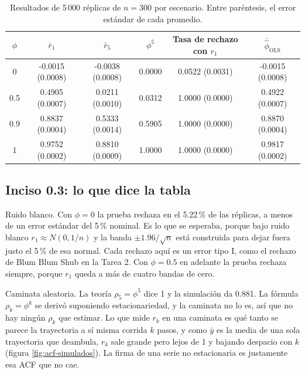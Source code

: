 \documentclass[11pt]{article}
\begin{document}
\begin{table}[H]
\centering
\caption{Resultados de 5\,000 réplicas de $n=300$ por escenario. Entre paréntesis, el error
estándar de cada promedio.}\label{tab:ar1}
\small
\begin{tabular}{|c|c|c|c|c|c|}
\hline
$\phi$ & $\bar r_1$ & $\bar r_5$ & $\phi^5$ & Tasa de rechazo con $r_1$ & $\bar{\hat\phi}_{\text{OLS}}$ \\
\hline
0 & -0.0015 (0.0008) & -0.0038 (0.0008) & 0.0000 & 0.0522 (0.0031) & -0.0015 (0.0008) \\
0.5 & 0.4905 (0.0007) & 0.0211 (0.0010) & 0.0312 & 1.0000 (0.0000) & 0.4922 (0.0007) \\
0.9 & 0.8837 (0.0004) & 0.5333 (0.0014) & 0.5905 & 1.0000 (0.0000) & 0.8870 (0.0004) \\
1 & 0.9752 (0.0002) & 0.8810 (0.0009) & 1.0000 & 1.0000 (0.0000) & 0.9817 (0.0002) \\
\hline
\end{tabular}
\end{table}

\subsection*{Inciso 0.3: lo que dice la tabla}

Ruido blanco. Con $\phi=0$ la prueba rechaza en el 5.22\,\% de las réplicas, a menos
de un error estándar del 5\,\% nominal. Es lo que se esperaba, porque bajo ruido blanco
$r_1\approx N(0,1/n)$ y la banda $\pm1.96/\sqrt n$ está construida para dejar fuera justo el
5\,\% de esa normal. Cada rechazo aquí es un error tipo I, como el rechazo de Blum Blum Shub en
la Tarea 2. Con $\phi=0.5$ en adelante la prueba rechaza siempre, porque $r_1$ queda a más de
cuatro bandas de cero.

Caminata aleatoria. La teoría $\rho_5=\phi^5$ dice 1 y la simulación da 0.881. La
fórmula $\rho_k=\phi^k$ se derivó suponiendo estacionariedad, y la caminata no lo es, así que
no hay ningún $\rho_k$ que estimar. Lo que mide $r_k$ en una caminata es qué tanto se parece
la trayectoria a sí misma corrida $k$ pasos, y como $\bar y$ es la media de una sola
trayectoria que deambula, $r_k$ sale grande pero lejos de 1 y bajando despacio con $k$ (figura
\ref{fig:acf-simulados}). La firma de una serie no estacionaria es justamente esa ACF que no
cae.
\end{document}
